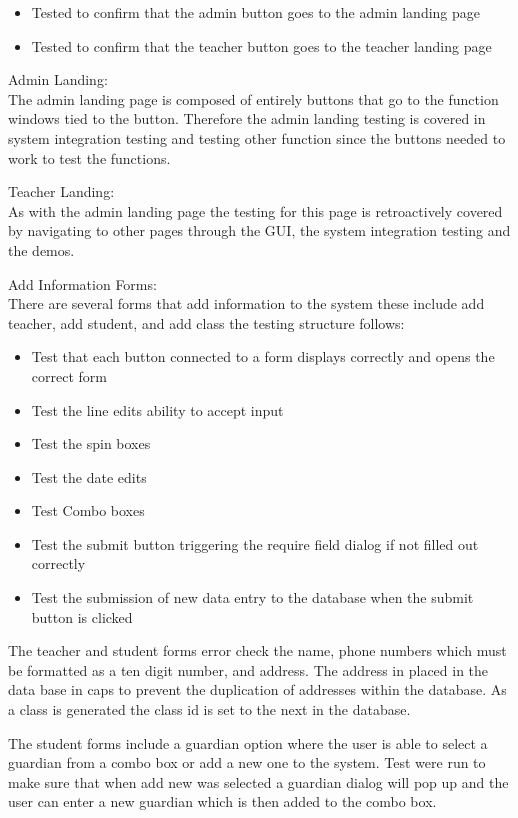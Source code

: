 \begin{itemize}
\item Tested to confirm that the admin button goes to the admin landing page
\item Tested to confirm that the teacher button goes to the teacher landing page
\end{itemize}

Admin Landing:\\

The admin landing page is composed of entirely buttons that go to the function windows tied to the button. Therefore the admin landing testing is covered in system integration testing and testing other function since the buttons needed to work to test the functions.

Teacher Landing:\\

As with the admin landing page the testing for this page is retroactively covered by navigating to other pages through the GUI, the system integration testing and the demos.

Add Information Forms:\\

There are several forms that add information to the system these include add teacher, add student, and add class the testing structure follows:

\begin{itemize}
\item Test that each button connected to a form displays correctly and opens the correct form
\item Test the line edits ability to accept input
\item Test the spin boxes
\item Test the date edits
\item Test Combo boxes
\item Test the submit button triggering the require field dialog if not filled out correctly
\item Test the submission of new data entry to the database when the submit button is clicked
\end{itemize}

The teacher and student forms error check the name, phone numbers which must be formatted as a ten digit number, and address. The address in placed in the data base in caps to prevent the duplication of addresses within the database. As a class is generated the class id is set to the next in the database.

The student forms include a guardian option where the user is able to select a guardian from a combo box or add a new one to the system. Test were run to make sure that when add new was selected a guardian dialog will pop up and the user can enter a new guardian which is then added to the combo box.

